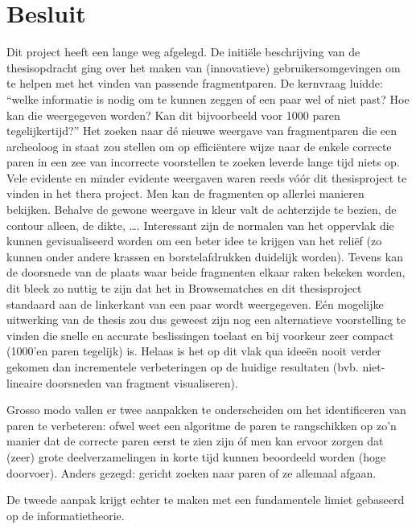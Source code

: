 \chapter{Besluit}
\label{hoofdstuk:besluit}

Dit project heeft een lange weg afgelegd. De initi\"ele beschrijving van de thesisopdracht ging over het maken van (innovatieve) gebruikersomgevingen om te helpen met het vinden van passende fragmentparen. De kernvraag luidde: ``welke informatie is nodig om te kunnen zeggen of een paar wel of niet past? Hoe kan die weergegeven worden? Kan dit bijvoorbeeld voor 1000 paren tegelijkertijd?'' Het zoeken naar d\'e nieuwe weergave van fragmentparen die een archeoloog in staat zou stellen om op effici\"entere wijze naar de enkele correcte paren in een zee van incorrecte voorstellen te zoeken leverde lange tijd niets op.\\

Vele evidente en minder evidente weergaven waren reeds v\'o\'or dit thesisproject te vinden in het thera project. Men kan de fragmenten op allerlei manieren bekijken. Behalve de gewone weergave in kleur valt de achterzijde te bezien, de contour alleen, de dikte, \ldots. Interessant zijn de normalen van het oppervlak die kunnen gevisualiseerd worden om een beter idee te krijgen van het reli\"ef (zo kunnen onder andere krassen en borstelafdrukken duidelijk worden). Tevens kan de doorsnede van de plaats waar beide fragmenten elkaar raken bekeken worden, dit bleek zo nuttig te zijn dat het in Browsematches en dit thesisproject standaard aan de linkerkant van een paar wordt weergegeven. E\'en mogelijke uitwerking van de thesis zou dus geweest zijn nog een alternatieve voorstelling te vinden die snelle en accurate beslissingen toelaat en bij voorkeur zeer compact (1000'en paren tegelijk) is. Helaas is het op dit vlak qua idee\"en nooit verder gekomen dan incrementele verbeteringen op de huidige resultaten (bvb. niet-lineaire doorsneden van fragment visualiseren). 

Grosso modo vallen er twee aanpakken te onderscheiden om het identificeren van paren te verbeteren: ofwel weet een algoritme de paren te rangschikken op zo'n manier dat de correcte paren eerst te zien zijn \'of men kan ervoor zorgen dat (zeer) grote deelverzamelingen in korte tijd kunnen beoordeeld worden (hoge doorvoer). Anders gezegd: gericht zoeken naar paren of ze allemaal afgaan.

De tweede aanpak krijgt echter te maken met een fundamentele limiet gebaseerd op de informatietheorie.

